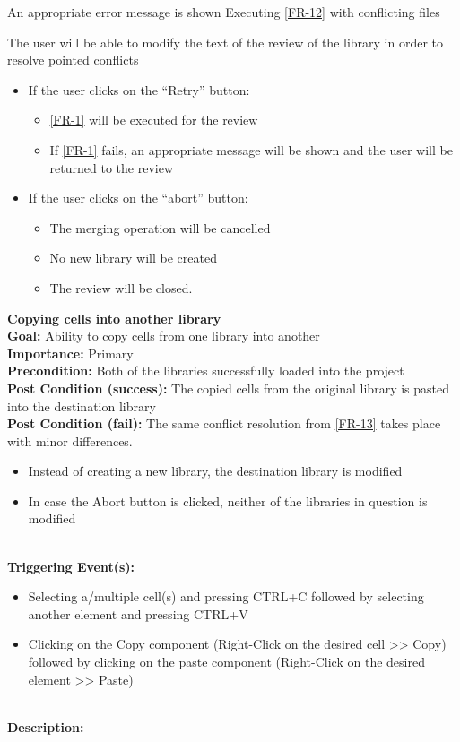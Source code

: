 \documentclass[10pt,a4paper]{report}
\newcommand{\precondition}[1]{
    \textbf{Precondition: } #1 \leavevmode \\
}
\newcommand{\FRDescription}[8]{
    \textbf{#1} \leavevmode \\
    \textbf{Goal: } #2 \leavevmode \\
    \textbf{Importance: } #3 \leavevmode \\
    \precondition{#4}
    \textbf{Post Condition (success): } #5 \leavevmode \\
    \textbf{Post Condition (fail): } #6 \leavevmode \\
    \textbf{Triggering Event(s): } #7 \leavevmode \\
    \textbf{Description: } \leavevmode \\ 
    #8}
\begin{document}
\begin{FR}
    {An appropriate error message is shown}
    {Executing \ref{FR-12} with conflicting files}
    {The user will be able to modify the text of the review of the library in order to resolve pointed conflicts
    \begin{itemize}
        \item If the user clicks on the “Retry” button:
        \begin{itemize}
            \item \ref{FR-1} will be executed for the review
            \item If \ref{FR-1} fails, an appropriate message will be shown and the user will be returned to the review
        \end{itemize}
        \item If the user clicks on the “abort” button:
        \begin{itemize}
            \item The merging operation will be cancelled
            \item No new library will be created
            \item The review will be closed.
        \end{itemize}
    \end{itemize}}
    \item \FRDescription{Copying cells into another library}
    {Ability to copy cells from one library into another}
    {Primary} 
    {Both of the libraries successfully loaded into the project}
    {The copied cells from the original library is pasted into the destination library}
    {The same conflict resolution from \ref{FR-13} takes place with minor differences.
    \begin{itemize}
        \item Instead of creating a new library, the destination library is modified
        \item In case the Abort button is clicked, neither of the libraries in question is modified
    \end{itemize}}
    {\begin{itemize}
        \item Selecting a/multiple cell(s) and pressing CTRL+C followed by selecting another element and pressing CTRL+V
        \item Clicking on the Copy component (Right-Click on the desired cell >> Copy) followed by clicking on the paste component (Right-Click on the desired element >> Paste)
    \end{itemize}}

\end{FR}
\end{document}
